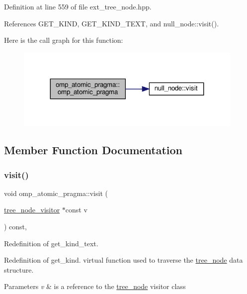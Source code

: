 Definition at line 559 of file ext\+\_\+tree\+\_\+node.\+hpp.



References G\+E\+T\+\_\+\+K\+I\+ND, G\+E\+T\+\_\+\+K\+I\+N\+D\+\_\+\+T\+E\+XT, and null\+\_\+node\+::visit().

Here is the call graph for this function\+:
\nopagebreak
\begin{figure}[H]
\begin{center}
\leavevmode
\includegraphics[width=311pt]{dc/d12/structomp__atomic__pragma_a2c78dee8e114b16af1d44a6a5ddd4940_cgraph}
\end{center}
\end{figure}


\subsection{Member Function Documentation}
\mbox{\label{structomp__atomic__pragma_adf901941aa33c47235e3b20d17410f63}} 
\subsubsection{\texorpdfstring{visit()}{visit()}}
{\footnotesize\ttfamily void omp\+\_\+atomic\+\_\+pragma\+::visit (\begin{DoxyParamCaption}\item[{\hyperlink{classtree__node__visitor}{tree\+\_\+node\+\_\+visitor} $\ast$const}]{v }\end{DoxyParamCaption}) const\hspace{0.3cm}{\ttfamily [override]}, {\ttfamily [virtual]}}



Redefinition of get\+\_\+kind\+\_\+text. 

Redefinition of get\+\_\+kind. virtual function used to traverse the \hyperlink{classtree__node}{tree\+\_\+node} data structure. 
\begin{DoxyParams}{Parameters}
{\em v} & is a reference to the \hyperlink{classtree__node}{tree\+\_\+node} visitor class \\
\hline
\end{DoxyParams}


